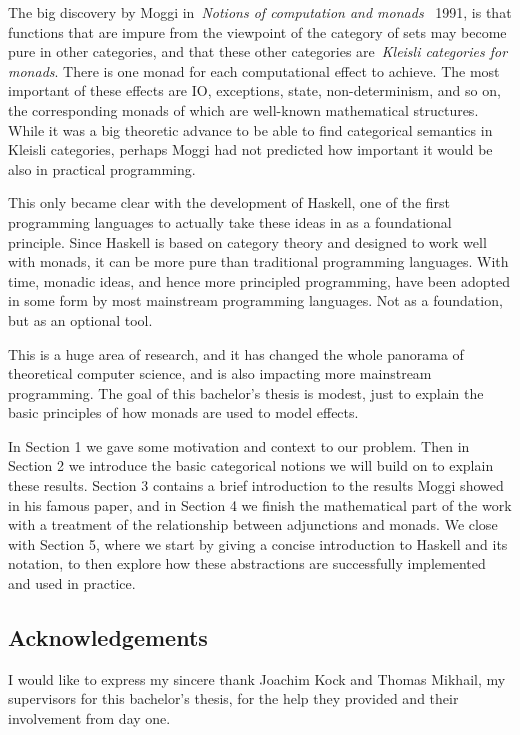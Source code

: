 \documentclass[../TGF.tex]{subfiles}
\begin{document}
The big discovery by Moggi in~\emph{Notions of computation and
monads}~\cite{Moggi-notions-computation-monads} 1991, is that functions that are
impure from the viewpoint of the category of sets may become pure in other
categories, and that these other categories are~\emph{Kleisli categories for
monads}. There is one monad for each computational effect to achieve. The most
important of these effects are IO, exceptions, state, non-determinism, and so
on, the corresponding monads of which are well-known mathematical structures.
While it was a big theoretic advance to be able to find categorical semantics in
Kleisli categories, perhaps Moggi had not predicted how important it would be
also in practical programming.

This only became clear with the development of Haskell, one of the first
programming languages to actually take these ideas in as a foundational
principle. Since Haskell is based on category theory and designed to work well
with monads, it can be more pure than traditional programming languages. With
time, monadic ideas, and hence more principled programming, have been adopted in
some form by most mainstream programming languages. Not as a foundation, but as
an optional tool.

This is a huge area of research, and it has changed the whole panorama of
theoretical computer science, and is also impacting more mainstream programming.
The goal of this bachelor's thesis is modest, just to explain the basic
principles of how monads are used to model effects.

In Section 1 we gave some motivation and context to our problem.
Then in Section 2 we introduce the basic categorical notions we will build on to
explain these results. Section 3 contains a brief introduction to the results
Moggi showed in his famous paper, and in Section 4 we finish the mathematical
part of the work with a treatment of the relationship between adjunctions and
monads. We close with Section 5, where we start by giving a concise introduction
to Haskell and its notation, to then explore how these abstractions are
successfully implemented and used in practice.

\subsection{Acknowledgements}
I would like to express my sincere thank Joachim Kock and Thomas Mikhail, my
supervisors for this bachelor's thesis, for the help they provided and their
involvement from day one.
\end{document}
